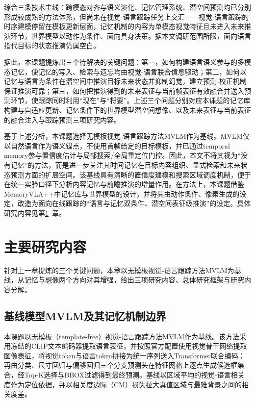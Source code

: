 综合三条技术主线：跨模态对齐与语义演化、记忆管理系统、潜空间预测均已分别形成较成熟的方法体系，但尚未在视觉-语言跟踪任务上交汇——视觉-语言跟踪的时序建模停留在模板更新层面，记忆机制的内容为单模态视觉特征且未进入未来推演环节，世界模型以动作为条件、面向具身决策。据本文调研范围所限，面向语言指代目标的状态推演仍属空白。

据此，本课题提炼出三个待解决的关键问题：第一，如何构建语言语义参与的多模态记忆，使记忆的写入、检索与遗忘均由视觉-语言联合信息驱动；第二，如何以记忆与语言为条件在潜空间中推演目标未来状态并抑制幻觉，建立预测-校正机制保证推演可靠；第三，如何把推演得到的未来表征与当前帧表征有效融合并送入预测环节，使跟踪同时利用“现在”与“将要”。上述三个问题分别对应本课题的记忆库构建与自适应更新、记忆条件下的世界模型潜空间想像、以及未来表征与当前表征的融合注入与跟踪预测三项研究内容。

基于上述分析，本课题选择无模板视觉-语言跟踪方法MVLM\cite{park2026mvlm}作为基线。MVLM\cite{park2026mvlm}仅以自然语言作为语义锚点，不使用首帧给定的目标模板，并已通过temporal memory参与置信度估计与局部搜索/全局重定位门控。因此，本文不将其视为“没有记忆”的方法，而是进一步关注其时间记忆在目标内容组织、显式检索和未来状态预测方面的扩展空间。该基线具有清晰的置信度建模和搜索区域调度机制，便于在统一实验口径下分析内容记忆与前瞻推演的增量作用。在方法上，本课题借鉴MemoryVLA++\cite{shi2026memoryvla}中记忆库与世界模型的设计，并将其由动作条件、像素生成的设定，改造为面向在线跟踪的“语言与记忆双条件、潜空间表征级推演”的设定。具体研究内容见第\ref{sec:content}~章。

\section{主要研究内容}
\label{sec:content}

针对上一章提炼的三个关键问题，本章以无模板视觉-语言跟踪方法MVLM\cite{park2026mvlm}为基线，从记忆与想像两个方向对其增强，给出三项研究内容、总体研究框架与研究内容分解。

\subsection{基线模型MVLM及其记忆机制边界}

本课题以无模板（template-free）视觉-语言跟踪方法MVLM\cite{park2026mvlm}作为基线。该方法采用冻结的CLIP文本编码器提取语言表征，并按照官方配置使用视觉骨干网络提取图像表征，将视觉token与语言token拼接为统一序列送入Transformer联合编码；再由分类、尺寸回归与偏移回归三个分支预测头在特征网格上逐点生成候选框集合，经Top-K选择与BBOX过滤得到最终预测。基线以区域平均的视觉-语言相关度作为定位依据，并以相关度边际（CM）损失拉大真值区域与最难背景之间的相关度差。


